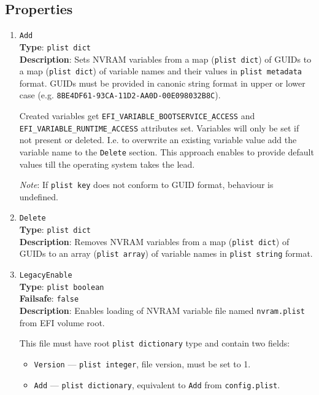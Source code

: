 \documentclass[]{article}
\makeatletter
\providecommand{\tightlist}{%
  \setlength{\itemsep}{0pt}\setlength{\parskip}{0pt}}
\renewcommand{\label}[1]{%
\zref@wrapper@immediate{\oldlabel{#1}}}  %
\makeatother
\begin{document}
\subsection{Properties}\label{nvramprops}

\begin{enumerate}
\item
  \texttt{Add}\\
  \textbf{Type}: \texttt{plist\ dict}\\
  \textbf{Description}: Sets NVRAM variables from a map (\texttt{plist\ dict})
  of GUIDs to a map (\texttt{plist\ dict}) of variable names and their values
  in \texttt{plist\ metadata} format. GUIDs must be provided in canonic string
  format in upper or lower case (e.g. \texttt{8BE4DF61-93CA-11D2-AA0D-00E098032B8C}).

  Created variables get \texttt{EFI\_VARIABLE\_BOOTSERVICE\_ACCESS} and
  \texttt{EFI\_VARIABLE\_RUNTIME\_ACCESS} attributes set.
  Variables will only be set if not present or deleted. I.e. to overwrite
  an existing variable value add the variable name to the \texttt{Delete} section.
  This approach enables to provide default values till the operating system
  takes the lead.

  \emph{Note}: If \texttt{plist\ key} does not conform to GUID format,
  behaviour is undefined.

\item
  \texttt{Delete}\\
  \textbf{Type}: \texttt{plist\ dict}\\
  \textbf{Description}: Removes NVRAM variables from a map (\texttt{plist\ dict})
  of GUIDs to an array (\texttt{plist\ array}) of variable names in
  \texttt{plist\ string} format.

\item
  \texttt{LegacyEnable}\\
  \textbf{Type}: \texttt{plist\ boolean}\\
  \textbf{Failsafe}: \texttt{false}\\
  \textbf{Description}: Enables loading of NVRAM variable file named \texttt{nvram.plist}
  from EFI volume root.

  This file must have root \texttt{plist\ dictionary} type and contain two fields:
  \begin{itemize}
  \tightlist
  \item \texttt{Version} --- \texttt{plist\ integer}, file version, must be set to 1.
  \item \texttt{Add} --- \texttt{plist\ dictionary}, equivalent to \texttt{Add} from
  \texttt{config.plist}.
  \end{itemize}


\end{enumerate}
\end{document}
